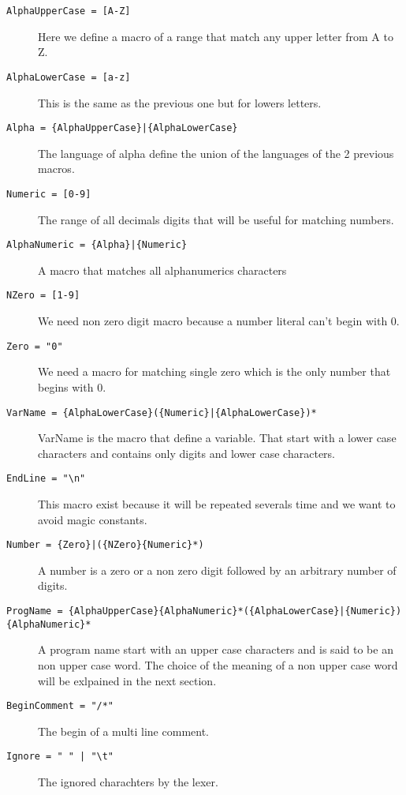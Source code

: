 \documentclass[12pt]{article}
\begin{document}
\begin{description}
    
    
    \item[\texttt{AlphaUpperCase = [A-Z]}]
    Here we define a macro of a range that match any upper letter from A to Z.
    
    \item[\texttt{AlphaLowerCase = [a-z]}]
    This is the same as the previous one but for lowers letters.
    
    \item[\texttt{Alpha          = \{AlphaUpperCase\}|\{AlphaLowerCase\}}]
    The language of alpha define the union of the languages of the 2 previous macros.
    
    \item[\texttt{Numeric        = [0-9]}]
    The range of all decimals digits that will be useful for matching numbers.
    
    \item[\texttt{AlphaNumeric	 = \{Alpha\}|\{Numeric\}}]
    A macro that matches all alphanumerics characters
    
    \item[\texttt{NZero          = [1-9]}]
    We need non zero digit macro because a number literal can't begin with 0.
    
    \item[\texttt{Zero           = "0"}]
    We need a macro for matching single zero which is the only number that begins with 0.
    
    \item[\texttt{VarName 	   = \{AlphaLowerCase\}(\{Numeric\}|\{AlphaLowerCase\})*}]
    VarName is the macro that define a variable. That start with a lower case characters and contains only digits and 
    lower case characters.
    
    \item[\texttt{EndLine        = "\textbackslash n"}]
    This macro exist because it will be repeated severals time and we want to avoid magic constants.
    
    \item[\texttt{Number         = \{Zero\}|(\{NZero\}\{Numeric\}*)}]
    A number is a zero or a non zero digit followed by an arbitrary number of digits.
    
    
    \item[\texttt{ProgName       =  \{AlphaUpperCase\}\{AlphaNumeric\}*(\{AlphaLowerCase\}|\{Numeric\})\{AlphaNumeric\}*}]
    A program name start with an upper case characters and is said to be an non upper case word. 
    The choice of the meaning of a non upper case word will be exlpained in the next section.
    
    \item[\texttt{BeginComment   = "/*"}] The begin of a multi line comment.

    \item[\texttt{Ignore 		   = " " | "\textbackslash t"}] The ignored charachters by the lexer. 

\end{description}
\end{document}
